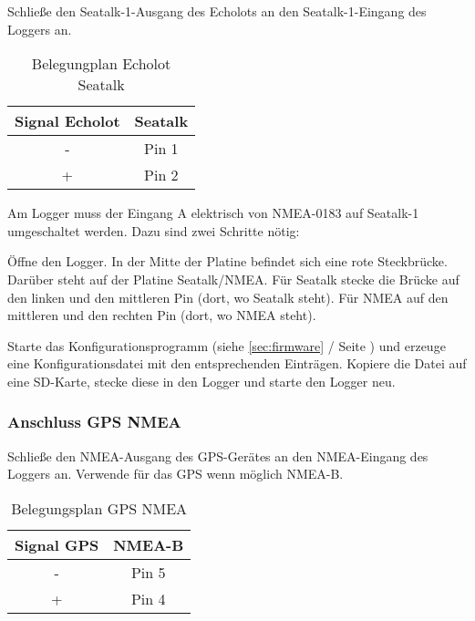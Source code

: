 \documentclass[pdftex, fontsize=8pt, paper=130mm:92mm,pagesize]{scrartcl}
\begin{document}
Schließe den Seatalk-1-Ausgang des Echolots an den Seatalk-1-Eingang des Loggers an. 

\begin{table}[H]
\centering
{}
\begin{tabular}{cc} \toprule
Signal Echolot & Seatalk\\ \midrule
- & Pin 1\\
+ & Pin 2\\ \bottomrule
\end{tabular}	
\caption{Belegungplan Echolot Seatalk}
\end{table}

Am Logger muss der Eingang A elektrisch von NMEA-0183 auf Seatalk-1 umgeschaltet werden. Dazu sind zwei Schritte nötig:

\begin{compactenum}
 \item Öffne den Logger. In der Mitte der Platine befindet sich eine rote Steckbrücke. Darüber steht auf der Platine \glqq Seatalk/NMEA\grqq{}. Für Seatalk stecke die Brücke auf den linken und den mittleren Pin (dort, wo \glqq Seatalk\grqq{} steht). Für NMEA auf den mittleren und den rechten Pin (dort, wo \glqq NMEA\grqq{} steht). 

\item Starte das Konfigurationsprogramm (siehe \ref{sec:firmware}  / Seite \pageref{sec:firmware}) und erzeuge eine Konfigurationsdatei mit den entsprechenden Einträgen. Kopiere die Datei auf eine SD-Karte, stecke diese in den Logger und starte den Logger neu. 
\end{compactenum}

\subsubsection{Anschluss GPS NMEA}

Schließe den NMEA-Ausgang des GPS-Gerätes an den NMEA-Eingang des Loggers an. Verwende für das GPS wenn möglich NMEA-B. 

\begin{table}[H]
\centering
{}
\begin{tabular}{cc} \toprule
Signal GPS & NMEA-B\\ \midrule
- & Pin 5\\
+ & Pin 4\\ \bottomrule
\end{tabular}	
\caption{Belegungsplan GPS NMEA}
\end{table}
\end{document}
